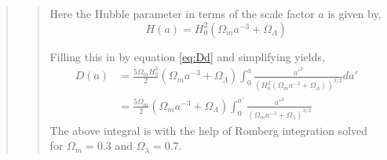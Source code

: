 \begin{quote}
\begin{quote}
Here the Hubble parameter in terms of the scale factor $a$ is given by,
\begin{equation}
H(a) = H_0^2 ( \Omega_m a^{-3} + \Omega_{\Lambda} )
\end{equation}

Filling this in by equation \ref{eq:Dd} and simplifying yields,
\begin{align}
D(a) &= \frac{5 \Omega_m H_0^3}{2} ( \Omega_m a^{-3} + \Omega_{\Lambda} ) \int_0^{a} \frac{a'^3}{\left(H_0^2( \Omega_m a^{-3} + \Omega_{\Lambda} ) \right)^{3/2}} da' \\
&= \frac{5 \Omega_m}{2}  ( \Omega_m a^{-3} + \Omega_{\Lambda} ) \int_0^{a'} \frac{a'^{3}}{\left(\Omega_m a^{-3} + \Omega_{\lambda}\right)^{3/2}}
\end{align}
\newpage
The above integral is with the help of Romberg integration solved for $\Omega_{m} =0.3$ and $\Omega_{\lambda} = 0.7$.  
\end{quote}
\end{quote}





